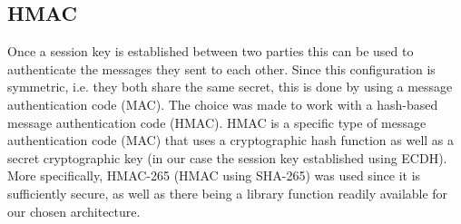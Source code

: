 \subsection{HMAC} 
\label{subsec:hmac}

Once a session key is established between two parties this can be used to authenticate the messages they sent to each other. Since this configuration is symmetric, i.e. they both share the same secret, this is done by using a message authentication code (MAC). The choice was made to work with a hash-based message authentication code (HMAC). HMAC is a specific type of message authentication code (MAC) that uses a cryptographic hash function as well as a secret cryptographic key (in our case the session key established using ECDH). More specifically, HMAC-265 (HMAC using SHA-265) was used since it is sufficiently secure, as well as there being a library function readily available for our chosen architecture.